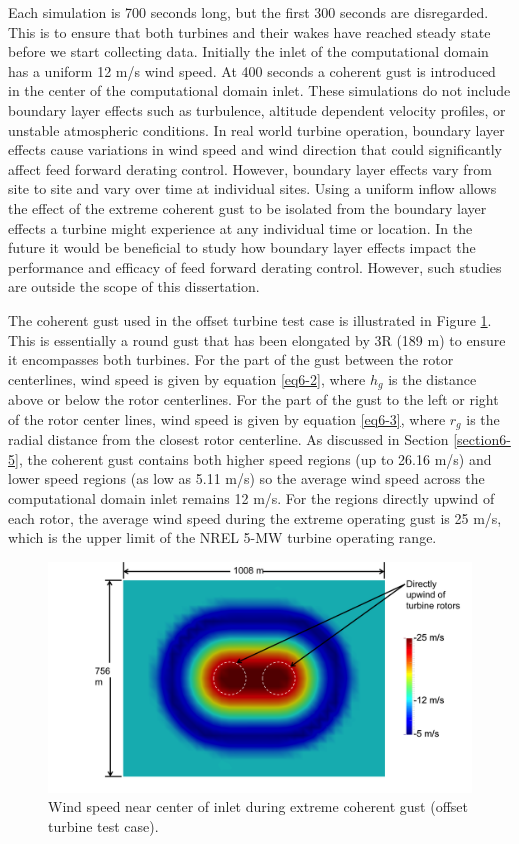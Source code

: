 Each simulation is 700 seconds long, but the first 300 seconds are disregarded. This is to ensure that both turbines and their wakes have reached steady state before we start collecting data. Initially the inlet of the computational domain has a uniform 12 m/s wind speed. At 400 seconds a coherent gust is introduced in the center of the computational domain inlet. These simulations do not include boundary layer effects such as turbulence, altitude dependent velocity profiles, or unstable atmospheric conditions. In real world turbine operation, boundary layer effects cause variations in wind speed and wind direction that could significantly affect feed forward derating control. However, boundary layer effects vary from site to site and vary over time at individual sites. Using a uniform inflow allows the effect of the extreme coherent gust to be isolated from the boundary layer effects a turbine might experience at any individual time or location. In the future it would be beneficial to study how boundary layer effects impact the performance and efficacy of feed forward derating control. However, such studies are outside the scope of this dissertation.

The coherent gust used in the offset turbine test case is illustrated in Figure \ref{fig6-13}. This is essentially a round gust that has been elongated by 3R (189 m) to ensure it encompasses both turbines. For the part of the gust between the rotor centerlines,  wind speed is given by equation \ref{eq6-2}, where $h_g$ is the distance above or below the rotor centerlines. For the part of the gust to the left or right of the rotor center lines, wind speed is given by equation \ref{eq6-3}, where $r_g$ is the radial distance from the closest rotor centerline. As discussed in Section \ref{section6-5}, the coherent gust contains both higher speed regions (up to 26.16 m/s) and lower speed regions (as low as 5.11 m/s) so the average wind speed across the computational domain inlet remains 12 m/s. For the regions directly upwind of each rotor, the average wind speed during the extreme operating gust is 25 m/s, which is the upper limit of the NREL 5-MW turbine operating range. 

\begin{figure}[ht]  
	\centering
		\includegraphics[width = \linewidth]{Figures/ch6Figures/fig6-13.png}

	\caption{Wind speed near center of inlet during extreme coherent gust (offset turbine test case).}
\label{fig6-13}
\end{figure}

